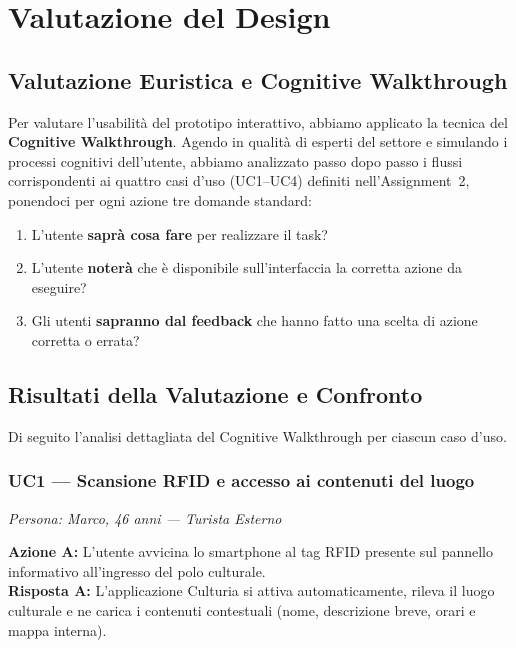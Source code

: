 \section{Valutazione del Design}

\subsection{Valutazione Euristica e Cognitive Walkthrough}

Per valutare l'usabilità del prototipo interattivo, abbiamo applicato la tecnica del \textbf{Cognitive Walkthrough}. Agendo in qualità di esperti del settore e simulando i processi cognitivi dell'utente, abbiamo analizzato passo dopo passo i flussi corrispondenti ai quattro casi d'uso (UC1--UC4) definiti nell'Assignment~2, ponendoci per ogni azione tre domande standard:

\begin{enumerate}[nosep, leftmargin=1.6em]
    \item L'utente \textbf{saprà cosa fare} per realizzare il task?
    \item L'utente \textbf{noterà} che è disponibile sull'interfaccia la corretta azione da eseguire?
    \item Gli utenti \textbf{sapranno dal feedback} che hanno fatto una scelta di azione corretta o errata?
\end{enumerate}

\subsection{Risultati della Valutazione e Confronto}

Di seguito l'analisi dettagliata del Cognitive Walkthrough per ciascun caso d'uso.

\subsubsection{UC1 --- Scansione RFID e accesso ai contenuti del luogo}
\textit{Persona: Marco, 46 anni --- Turista Esterno}

\vspace{0.3cm}

\noindent\textbf{Azione A:} L'utente avvicina lo smartphone al tag RFID presente sul pannello informativo all'ingresso del polo culturale.\\
\textbf{Risposta A:} L'applicazione Culturia si attiva automaticamente, rileva il luogo culturale e ne carica i contenuti contestuali (nome, descrizione breve, orari e mappa interna).

